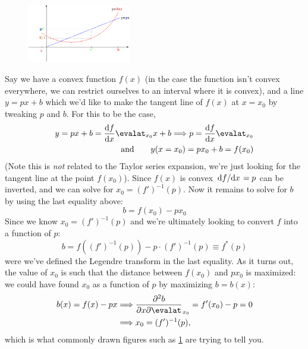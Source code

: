 \documentclass{report}
\begin{document}
\begin{figure}
	\begin{center}
		\includegraphics[width=0.4\textwidth]{figs/march/512px-Legendre_transformation.png}
		\caption{}
		\label{fig:legendre}
	\end{center}
	\vspace*{-4em}
\end{figure}
Say we have a convex function $ f(x) $ (in the case the function isn't convex
everywhere, we can restrict ourselves to an interval where it is convex), and a
line $ y=px + b $ which we'd like to make the tangent line of $ f(x) $ at $
x=x_0 $ by tweaking $ p $ and $ b $. For this to be the case,
\begin{align*}
	y = px + b = \dv{f}{x}\evalat_{x_0} x + b 
	\Longrightarrow p = \dv{f}{x}\evalat_{x_0}\\
	\qquad
	\text{and}\qquad 
	y(x=x_0)=p x_0 + b  = f(x_0)
\end{align*} 
(Note this is \textit{not} related to the Taylor series expansion, we're just 
looking for the tangent line at the point $ f(x_0) $). Since $ f(x) $ is convex
$ \dv*{f}{x} = p $ can be inverted, and we can solve for $ x_0 = (f')^{-1} (p)$. 
Now it remains to solve for $ b $ by using the last equality above: 
\begin{equation*}
	b = f(x_0) - px_0
\end{equation*}
Since we know $ x_0 = (f')^{-1}(p) $ and we're ultimately looking to convert 
$ f $ into a function of $ p $:
\begin{equation*}
	b = f((f')^{-1}(p)) - p \cdot (f')^{-1} (p)
	\equiv f^\ast(p)
\end{equation*}
were we've defined the Legendre transform in the last equality. As it turns out,
the value of $ x_0 $ is such that the distance between $ f(x_0) $ and 
$ px_0 $ is maximized: we could have found $ x_0 $ as a function of $ p $ 
by maximizing $ b=b(x) $:
\begin{align*}
	b(x) = f(x) - px 
	&\Longrightarrow \pdv{b}{x}\evalat_{x_0} = f'(x_0) - p = 0 \\
	&\Longrightarrow x_0 = (f')^{-1}(p),
\end{align*}
which is what commonly drawn figures such as \cref{fig:legendre}
are trying to tell you.
\end{document}

